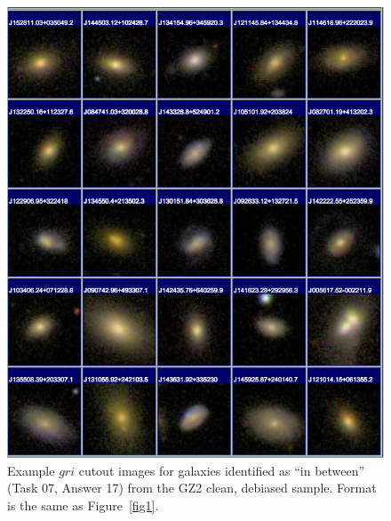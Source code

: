 \documentclass[useAMS,usenatbib]{mn2e}
\begin{document}
\newpage
\clearpage
\begin{figure}
\includegraphics[angle=0,width=7.0in]{figures/gallery/inbetween.png}
\caption{Example $gri$ cutout images for galaxies identified as ``in between'' (Task 07, Answer 17) from the GZ2 clean, debiased sample. Format is the same as Figure~\ref{fig1}.}
\end{figure}
\end{document}
